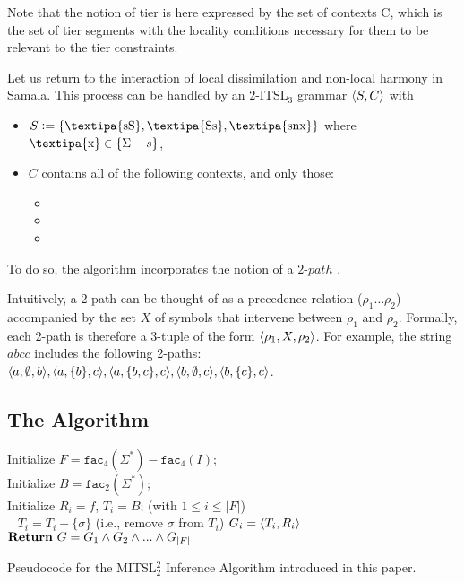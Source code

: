 \documentclass[11pt,a4paper]{article}
\newcommand{\facn}[1]{\ensuremath{\texttt{fac}_{#1}}}
\begin{document}
Note that the notion of tier is here expressed by the set of contexts C, which is the set of tier segments with the locality conditions necessary for them to be relevant to the tier constraints.

Let us return to the interaction of local dissimilation and non-local harmony in Samala.
This process can be handled by an $2$-ITSL$_3$ grammar $\left \langle S, C \right \rangle $ with
%
\begin{itemize}
    \item $S \is \setof{ \text{\textipa{sS}}, \text{\textipa{Ss}}, \text{\textipa{snx}} }$ where $\text{\textipa{x}} \in \{\Sigma - s\}$,
    \item $C$ contains all of the following contexts, and only those:
        \begin{itemize}
            \item {}
            \item {}
            \item {}
        \end{itemize}
\end{itemize}

To do so, the algorithm incorporates the notion of a $2\text{-}path$ \citep{JardineHeinz2016}. 

Intuitively, a 2-path can be thought of as a precedence relation ($\rho_1\ldots{}\rho_2$) accompanied by the set $X$ of symbols that intervene between $\rho_1$ and $\rho_2$. Formally, each 2-path is therefore a 3-tuple of the form $\langle{\rho_1, X, \rho_2}\rangle$. For example, the string $abcc$ includes the following 2-paths: $\langle{a, \emptyset, b}\rangle, \langle{a, \{b\}, c}\rangle, \langle{a, \{b,c\}, c}\rangle, \langle{b, \emptyset, c}\rangle, \langle{b, \{c\}, c}\rangle$. 
\subsection{The Algorithm}

\begin{algorithm}[!ht]
    Initialize $F=\facn{4}(\Sigma^*)-\facn{4}(I)$; \\
    Initialize $B=\facn{2}(\Sigma^*)$; \\
        	{
            Initialize $R_i=f$, $T_i=B$; (with $1 \leq i \leq  |F|$) \\
            	{
                	~
    					{$T_i=T_i-\{\sigma\}$ (i.e., remove $\sigma$ from $T_i$)}}
					$G_i=\langle{T_i,R_i}\rangle$
                }
            $\mathbf{Return}\textnormal{ }G=G_1\wedge G_2\wedge ... \wedge G_{|F|}$
            \medskip
	\caption{Pseudocode for the MITSL$^2_2$ Inference Algorithm introduced in this paper.}
\end{algorithm}
\end{document}
